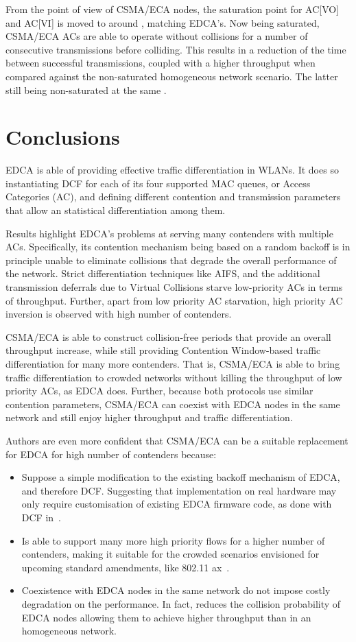 \documentclass[a4paper]{article}
\begin{document}
From the point of view of CSMA/ECA nodes, the saturation point for AC[VO] and AC[VI] is moved to around , matching EDCA's. Now being saturated, CSMA/ECA ACs are able to operate without collisions for a number of consecutive transmissions before colliding. This results in a reduction of the time between successful transmissions, coupled with a higher throughput when compared against the non-saturated homogeneous network scenario. The latter still being non-saturated at the same .

\section{Conclusions}\label{section5}
EDCA is able of providing effective traffic differentiation in WLANs. It does so instantiating DCF for each of its four supported MAC queues, or Access Categories (AC), and defining different contention and transmission parameters that allow an statistical differentiation among them. 

Results highlight EDCA's problems at serving many contenders with multiple ACs. Specifically, its contention mechanism being based on a random backoff is in principle unable to eliminate collisions that degrade the overall performance of the network. Strict differentiation techniques like AIFS, and the additional transmission deferrals due to Virtual Collisions starve low-priority ACs in terms of throughput. Further, apart from low priority AC starvation, high priority AC inversion is observed with high number of contenders.

CSMA/ECA is able to construct collision-free periods that provide an overall throughput increase, while still providing Contention Window-based traffic differentiation for many more contenders. That is, CSMA/ECA is able to bring traffic differentiation to crowded networks without killing the throughput of low priority ACs, as EDCA does. Further, because both protocols use similar contention parameters, CSMA/ECA can coexist with EDCA nodes in the same network and still enjoy higher throughput and traffic differentiation.

Authors are even more confident that CSMA/ECA can be a suitable replacement for EDCA for high number of contenders because:
	\begin{itemize}
		\item Suppose a simple modification to the existing backoff mechanism of EDCA, and therefore DCF. Suggesting that implementation on real hardware may only require customisation of existing EDCA firmware code, as done with DCF in~\cite{sanabria2014high}.
		\item Is able to support many more high priority flows for a higher number of contenders, making it suitable for the crowded scenarios envisioned for upcoming standard amendments, like 802.11 ax~\cite{IEEE80211ax, bellalta2015WCM}.
		\item Coexistence with EDCA nodes in the same network do not impose costly degradation on the performance. In fact, reduces the collision probability of EDCA nodes allowing them to achieve higher throughput than in an homogeneous network.
	\end{itemize}
	
\end{document}
